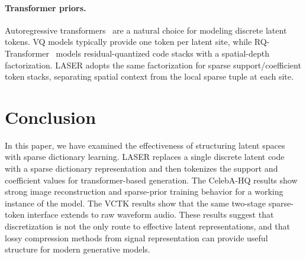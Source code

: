 \documentclass[10pt]{article}
\begin{document}
\paragraph{Transformer priors.}
Autoregressive transformers~\citep{vaswani2017attention} are a natural choice for modeling discrete latent tokens. VQ models typically provide one token per latent site, while RQ-Transformer~\citep{lee2022rqvae} models residual-quantized code stacks with a spatial-depth factorization. LASER adopts the same factorization for sparse support/coefficient token stacks, separating spatial context from the local sparse tuple at each site.

\section{Conclusion}

In this paper, we have examined the effectiveness of structuring latent spaces with sparse dictionary learning. LASER replaces a single discrete latent code with a sparse dictionary representation and then tokenizes the support and coefficient values for transformer-based generation. The CelebA-HQ results show strong image reconstruction and sparse-prior training behavior for a working instance of the model. The VCTK results show that the same two-stage sparse-token interface extends to raw waveform audio. These results suggest that discretization is not the only route to effective latent representations, and that lossy compression methods from signal representation can provide useful structure for modern generative models.



\end{document}
